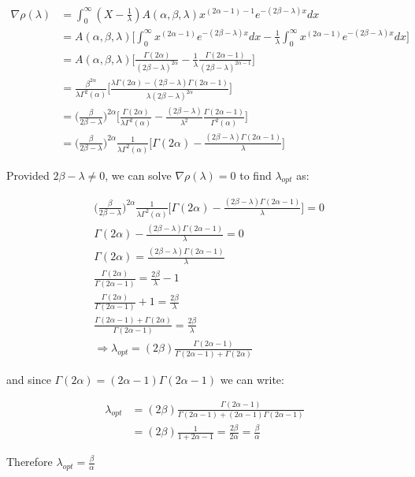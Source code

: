 \documentclass{article}
\begin{document}
\begin{align*}
\nabla \rho(\lambda) &= \int_{0}^{\infty} (X - \frac{1}{\lambda}) A(\alpha,\beta,\lambda) x^{(2 \alpha - 1) - 1} e^{-(2 \beta - \lambda)x} dx \\
&= A(\alpha,\beta,\lambda) \Bigg[ \int_{0}^{\infty} x^{(2 \alpha - 1)} e^{-(2 \beta - \lambda)x} dx - \frac{1}{\lambda} \int_{0}^{\infty} x^{(2 \alpha - 1)} e^{-(2 \beta - \lambda) x} dx \Bigg] \\
&= A(\alpha,\beta,\lambda) \Bigg[ \frac{\Gamma(2 \alpha)}{ (2 \beta - \lambda)^{2 \alpha} } - \frac{1}{\lambda} \frac{\Gamma(2 \alpha - 1)}{(2 \beta - \lambda)^{2 \alpha - 1}} \Bigg] \\
&= \frac{\beta^{2 \alpha}}{\lambda \Gamma^{2}(\alpha)} \Bigg[ \frac{\lambda \Gamma(2 \alpha) - (2 \beta - \lambda) \Gamma(2 \alpha - 1)}{ \lambda (2 \beta - \lambda)^{2 \alpha} } \Bigg] \\
&= \Bigg( \frac{\beta}{ 2 \beta - \lambda} \Bigg)^{2 \alpha} \Bigg[ \frac{\Gamma(2 \alpha)}{\lambda \Gamma^{2}(\alpha)} - \frac{(2 \beta - \lambda)}{\lambda^2} \frac{\Gamma(2 \alpha - 1)}{\Gamma^{2}(\alpha)} \Bigg] \\
&= \Bigg( \frac{\beta}{ 2 \beta - \lambda} \Bigg)^{2 \alpha} \frac{1}{\lambda \Gamma^{2}(\alpha)} \Bigg[ \Gamma(2 \alpha) - \frac{(2\beta-\lambda)\Gamma(2\alpha-1)}{\lambda} \Bigg]
\end{align*}

Provided $2 \beta - \lambda \neq 0$, we can solve $\nabla \rho(\lambda) = 0$ to find $\lambda_{opt}$ as:

\begin{align*}
&\Bigg( \frac{\beta}{ 2 \beta - \lambda} \Bigg)^{2 \alpha} \frac{1}{\lambda \Gamma^{2}(\alpha)} \Bigg[ \Gamma(2 \alpha) - \frac{(2\beta-\lambda)\Gamma(2\alpha-1)}{\lambda} \Bigg] = 0 \\
&\Gamma(2 \alpha) - \frac{(2\beta - \lambda) \Gamma(2 \alpha - 1)}{\lambda} = 0 \\
&\Gamma(2 \alpha) = \frac{(2\beta - \lambda) \Gamma(2 \alpha - 1)}{\lambda} \\
&\frac{\Gamma(2 \alpha)}{\Gamma(2 \alpha - 1)} = \frac{2 \beta}{\lambda} - 1 \\
&\frac{\Gamma(2 \alpha)}{\Gamma(2 \alpha - 1)} + 1 = \frac{2 \beta}{\lambda} \\
&\frac{ \Gamma(2 \alpha - 1) + \Gamma(2 \alpha) }{\Gamma(2 \alpha - 1)} = \frac{2\beta}{\lambda} \\
&\Rightarrow \lambda_{opt} = (2 \beta) \frac{\Gamma(2 \alpha - 1)}{ \Gamma(2 \alpha - 1) + \Gamma(2 \alpha) }
\end{align*}

and since $\Gamma(2 \alpha) = (2 \alpha - 1) \Gamma(2 \alpha - 1)$ we can write:

\begin{align*}
\lambda_{opt} &=  (2 \beta) \frac{\Gamma(2 \alpha - 1)}{ \Gamma(2 \alpha - 1) +  (2 \alpha - 1) \Gamma(2 \alpha - 1) } \\
&= (2 \beta) \frac{1}{1 + 2 \alpha - 1} = \frac{2 \beta}{2 \alpha} = \frac{\beta}{\alpha}
\end{align*}

Therefore $\lambda_{opt} = \frac{\beta}{\alpha}$




\end{document}
